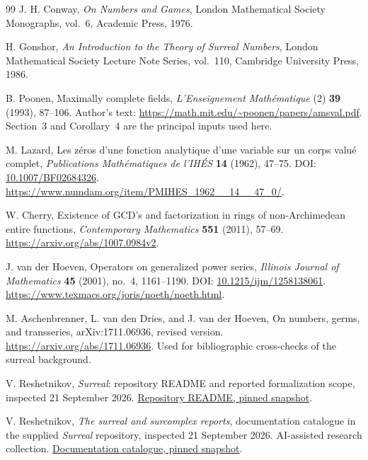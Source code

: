 \documentclass[11pt]{article}
\theoremstyle{plain}
\theoremstyle{plain}
\theoremstyle{plain}
\theoremstyle{definition}
\theoremstyle{definition}
\theoremstyle{definition}
\theoremstyle{remark}
\begin{document}
\clearpage
{}
\begin{thebibliography}{99}
J. H. Conway, \emph{On Numbers and Games}, London Mathematical Society
Monographs, vol.~6, Academic Press, 1976.

H. Gonshor, \emph{An Introduction to the Theory of Surreal Numbers},
London Mathematical Society Lecture Note Series, vol.~110,
Cambridge University Press, 1986.

B. Poonen, Maximally complete fields, \emph{L'Enseignement
Math\'ematique} (2) \textbf{39} (1993), 87--106.
Author's text: \url{https://math.mit.edu/~poonen/papers/amsval.pdf}.
Section~3 and Corollary~4 are the principal inputs used here.

M. Lazard, Les z\'eros d'une fonction analytique d'une variable sur un
corps valu\'e complet, \emph{Publications Math\'ematiques de l'IH\'ES}
\textbf{14} (1962), 47--75. DOI: \href{https://doi.org/10.1007/BF02684326}{10.1007/BF02684326}.
\url{https://www.numdam.org/item/PMIHES_1962__14__47_0/}.

W. Cherry, Existence of GCD's and factorization in rings of
non-Archimedean entire functions, \emph{Contemporary Mathematics}
\textbf{551} (2011), 57--69.
\url{https://arxiv.org/abs/1007.0984v2}.

J. van der Hoeven, Operators on generalized power series,
\emph{Illinois Journal of Mathematics} \textbf{45} (2001), no.~4,
1161--1190. DOI:
\href{https://doi.org/10.1215/ijm/1258138061}{10.1215/ijm/1258138061}.
\url{https://www.texmacs.org/joris/noeth/noeth.html}.

M. Aschenbrenner, L. van den Dries, and J. van der Hoeven,
On numbers, germs, and transseries, arXiv:1711.06936,
revised version. \url{https://arxiv.org/abs/1711.06936}.
Used for bibliographic cross-checks of the surreal background.

V. Reshetnikov, \emph{Surreal}: repository README and reported
formalization scope, inspected 21 September 2026.
\href{https://github.com/VladimirReshetnikov/Surreal/blob/4896a2808ce30e01b1c86ae3ba2295a64762d246/README.md}{Repository README, pinned snapshot}.

V. Reshetnikov, \emph{The surreal and surcomplex reports}, documentation
catalogue in the supplied \emph{Surreal} repository, inspected
21 September 2026. AI-assisted research collection.
\href{https://github.com/VladimirReshetnikov/Surreal/blob/4896a2808ce30e01b1c86ae3ba2295a64762d246/docs/README.md}{Documentation catalogue, pinned snapshot}.


\end{thebibliography}
\end{document}
